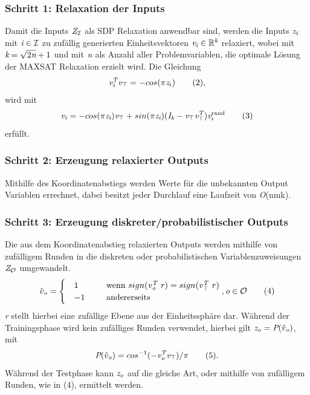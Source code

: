 \subsubsection{Schritt 1: Relaxation der Inputs}
Damit die Inputs $\emph{Z}_{\mathcal{I}}$ als SDP Relaxation anwendbar sind, werden die Inputs $\emph{z}_\emph{i}$ mit $\emph{i} \in \mathcal{I}$ zu zufällig generierten Einheitsvektoren $\emph{v}_{\emph{i}} \in \mathbb{R}^\emph{k}$ relaxiert, wobei mit $\emph{k} = \sqrt{2\emph{n}} + 1$ und mit $\emph{n}$ als Anzahl aller Problemvariablen, die optimale Lösung der MAXSAT Relaxation erzielt wird. Die Gleichung
\[ \emph{v}_{\emph{i}}^\emph{T} \emph{v}_{\top} = -cos(\pi\emph{z}_{i})\qquad(2),\] wird mit
\[ \emph{v}_{\emph{i}} = -cos(\pi\emph{z}_{\emph{i}})\emph{v}_{\top} + sin(\pi\emph{z}_\emph{i})(\emph{I}_{\emph{k}} - \emph{v}_{\top}\emph{v}_{\top}^\emph{T})\emph{v}_{i}^\text{rand}\qquad(3)\] erfüllt.
\cite[p.~4]{https://doi.org/10.48550/arxiv.1905.12149}
\subsubsection{Schritt 2: Erzeugung relaxierter Outputs}
Mithilfe des Koordinatenabstiegs werden Werte für die unbekannten Output Variablen errechnet, dabei besitzt jeder Durchlauf eine Laufzeit von \emph{O}(nmk).
\cite[p.~4]{https://doi.org/10.48550/arxiv.1905.12149}
\subsubsection{Schritt 3: Erzeugung diskreter/probabilistischer Outputs}
Die aus dem Koordinatenabstieg relaxierten Outputs werden mithilfe von zufälligem Runden in die diskreten oder probabilistischen Variablenzuweisungen $\emph{Z}_{\mathcal{O}}$ umgewandelt.
\[ \tilde{v}_{\emph{o}} = \begin{cases}
 & 1 \qquad \quad \text{ wenn } sign($\emph{v}$_\emph{o}^\emph{T}$ \emph{r}$) = sign($\emph{v}$_\emph{$\top$}^\emph{T}$ \emph{r}$) \\ 
 & -1 \qquad \: \text{ andererseits }
\end{cases}, \emph{o} \in \mathcal{O}\qquad(4)\] \emph{r} stellt hierbei eine zufällige Ebene aus der Einheitssphäre dar.
Während der Trainingsphase wird kein zufälliges Runden verwendet, hierbei gilt $\emph{z}_\emph{o} = \emph{P}(\tilde{v}_{\emph{o}})$, mit
\[ \emph{P}(\tilde{v}_{\emph{o}}) = cos^{-1}(-\emph{v}_\emph{o}^\emph{T} \emph{v}_{\top})/\pi \qquad(5).\]
Während der Testphase kann $\emph{z}_{\emph{o}}$ auf die gleiche Art, oder mithilfe von zufälligem Runden, wie in (4), ermittelt werden. \cite[p.~4]{https://doi.org/10.48550/arxiv.1905.12149}
